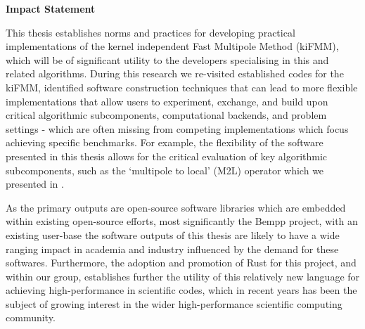 
\thispagestyle{plain}

\begin{center}
    \textbf{Impact Statement}
\end{center}


This thesis establishes norms and practices for developing practical implementations of the kernel independent Fast Multipole Method (kiFMM), which will be of significant utility to the developers specialising in this and related algorithms. During this research we re-visited established codes for the kiFMM, identified software construction techniques that can lead to more flexible implementations that allow users to experiment, exchange, and build upon critical algorithmic subcomponents, computational backends, and problem settings - which are often missing from competing implementations which focus achieving specific benchmarks. For example, the flexibility of the software presented in this thesis allows for the critical evaluation of key algorithmic subcomponents, such as the `multipole to local' (M2L) operator which we presented in \cite{kailasa2024m2ltranslationoperatorskernel}.

As the primary outputs are open-source software libraries \cite{kailasa2022pyexafmm,kailasa2024kifmmrs} which are embedded within existing open-source efforts, most significantly the Bempp project, with an existing user-base the software outputs of this thesis are likely to have a wide ranging impact in academia and industry influenced by the demand for these softwares. Furthermore, the adoption and promotion of Rust for this project, and within our group, establishes further the utility of this relatively new language for achieving high-performance in scientific codes, which in recent years has been the subject of growing interest in the wider high-performance scientific computing community.
